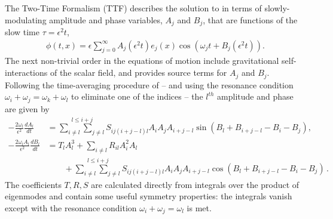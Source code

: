 \documentclass[letterpaper,11pt]{article}
\newcommand{\oi}{\omega_i}
\newcommand{\oj}{\omega_j}
\newcommand{\ok}{\omega_k}
\newcommand{\ol}{\omega_l}
\begin{document}
The Two-Time Formalism (TTF) describes the solution to \label{linized} in terms of slowly-modulating amplitude and phase variables, $A_j$ and $B_j$, that are functions of the slow time $\tau = \epsilon^2 t$,
\begin{align}
\label{phi ttf}
\phi(t,x) = \epsilon \sum_{j=0}^\infty A_j (\epsilon^2 t) e_j(x) \cos \left(\omega_j t + B_j(\epsilon^2 t) \right).
\end{align}
The next non-trivial order in the equations of motion include gravitational self-interactions of the scalar field, and provides source terms for $A_j$ and $B_j$. Following the time-averaging procedure of \cite{1407.6273} -- and using the resonance condition $\oi + \oj = \ok + \ol$ to eliminate one of the indices -- the $l^{th}$ amplitude and phase are given by
\begin{align}
\label{RN1}
-\frac{2\omega_l}{\epsilon^2} \frac{d A_l}{d t} &= \stackrel{l \leq i + j}{\sum_{i \neq l} \sum_{j \neq l}} S_{ij (i + j -l) l} A_i A_j A_{i + j - l} \sin \left( B_l + B_{i+j-l} - B_i - B_j \right) , \\
\label{RN2}
- \frac{2 \omega_l A_l}{\epsilon^2} \frac{d B_l}{dt} &= T_l A_l^3 + \sum_{i \neq l} R_{i l} A^2_i A_l  \nonumber \\
& \qquad + \stackrel{l \leq i + j}{\sum_{i \neq l} \sum_{j \neq l}} S_{ij (i + j -l) l} A_i A_j A_{i + j - l} \cos \left( B_l + B_{i+j-l} - B_i - B_j \right) \, .
\end{align}
The coefficients $T, R, S$ are calculated directly from integrals over the product of eigenmodes and contain some useful symmetry properties: the integrals vanish except with the resonance condition $\omega_i + \omega_j = \omega_l$ is met. 
\end{document}
